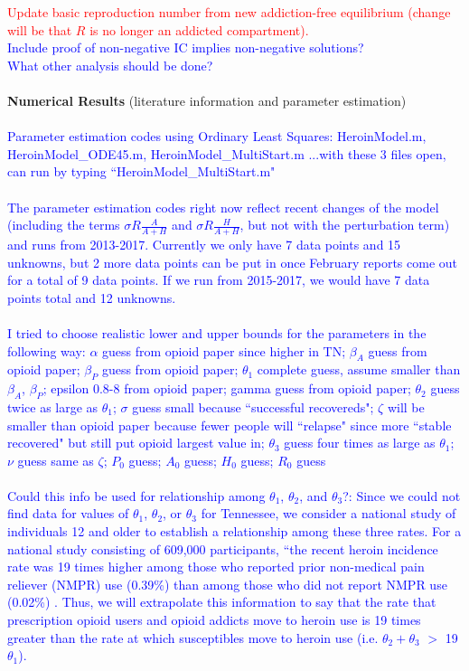 \documentclass[12pt]{article}
\begin{document}
\textcolor{red}{Update basic reproduction number from new addiction-free equilibrium (change will be that $R$ is no longer an addicted compartment).} \\  
\textcolor{blue}{Include proof of non-negative IC implies non-negative solutions?} \\ 
\textcolor{blue}{What other analysis should be done?} \\ \\
\textbf{Numerical Results} 
(literature information and parameter estimation) \\ \\
\textcolor{blue}{Parameter estimation codes using Ordinary Least Squares: HeroinModel.m, \linebreak HeroinModel\_ODE45.m, HeroinModel\_MultiStart.m ...with these 3 files open, can run by typing ``HeroinModel\_MultiStart.m" \\ \\
The parameter estimation codes right now reflect recent changes of the model (including the terms $\sigma R \frac{A}{A+H}$ and $\sigma R \frac{H}{A+H}$, but not with the perturbation term) and runs from 2013-2017. Currently we only have 7 data points and 15 unknowns, but 2 more data points can be put in once February reports come out for a total of 9 data points. If we run from 2015-2017, we would have 7 data points total and 12 unknowns. \\ \\
I tried to choose realistic lower and upper bounds for the parameters in the following way: $\alpha$ guess from opioid paper since higher in TN; $\beta_A $ guess from opioid paper; 
 $\beta_P$ guess from opioid paper; $\theta_1$ complete guess, assume smaller than $\beta_A$, $\beta_P$; 
 epsilon 0.8-8 from opioid paper; gamma guess from opioid paper; $\theta_2$
 guess twice as large as $\theta_1$; $\sigma$ guess small because
 ``successful recovereds"; $\zeta$ will be smaller than opioid paper because fewer people will ``relapse" since more ``stable recovered" but still
 put opioid largest value in; $\theta_3$ guess four times as large as
 $\theta_1$; $\nu$ guess same as $\zeta$; $P_0$
 guess; $A_0$ guess; $H_0$ guess; $R_0$ guess} \\ \\
 \textcolor{blue}{Could this info be used for relationship among $\theta_1$, $\theta_2$, and $\theta_3$?: Since we could not find data for values of $\theta_1$, $\theta_2$, or $\theta_3$ for Tennessee, we consider a national study of individuals 12 and older to establish a relationship among these three rates. For a national study consisting of 609,000 participants, ``the recent heroin incidence rate was 19 times higher among those who reported prior non-medical pain reliever (NMPR) use (0.39\%) than among those who did not report NMPR use (0.02\%) \cite{Muhuri}.
Thus, we will extrapolate this information to say that the rate that prescription opioid users and opioid addicts move to heroin use is 19 times greater than the rate at which susceptibles move to heroin use (i.e. $\theta_2 + \theta_3$ $>$ 19$\theta_1$).} \\
\end{document}

